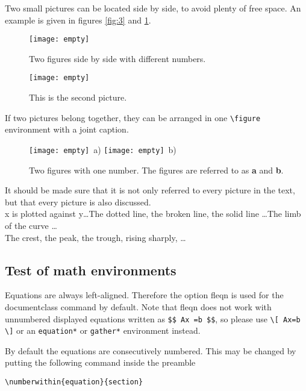 Two small pictures can be located side by side, to avoid plenty of free space. An example is given in figures \ref{fig:3} and \ref{fig:4}.
\begin{figure}
\begin{minipage}{72mm}
\texttt{[image: empty]}
\caption{Two figures side by side with different numbers.}
\label{fig:3}
\end{minipage}
\hfil
\begin{minipage}{65mm}
\texttt{[image: empty]}
\caption{This is the second picture.}
\label{fig:4}
\end{minipage}
\end{figure}

If two pictures belong together, they can be arranged in one \verb+\figure+ environment with a joint caption.
\begin{figure}
\texttt{[image: empty]}~a)
\hfil
\texttt{[image: empty]}~b)
\caption{Two figures with one number. The figures are referred to as \textbf{a}
and \textbf{b}.}
\label{fig:5}
\end{figure}

It should be made sure that it is not only referred to every picture in the text, but that every picture is also discussed.\\
x is plotted against y\dots The dotted line, the broken line, the solid line \dots The limb of the curve \dots\\
The crest, the peak, the trough, rising sharply, \dots
\subsection{Test of math environments}
Equations are always left-aligned. Therefore the option {fleqn} is used for the
documentclass command by default. Note that {fleqn} does not work with
unnumbered displayed equations written as \verb+$$ Ax =b $$+, so please use
\verb+\[ Ax=b \]+ or an \texttt{equation*} or \texttt{gather*} environment
instead.

By default the equations are consecutively numbered. This may be changed by
putting the following command inside the preamble
\begin{center}
  \verb+\numberwithin{equation}{section}+
\end{center}

